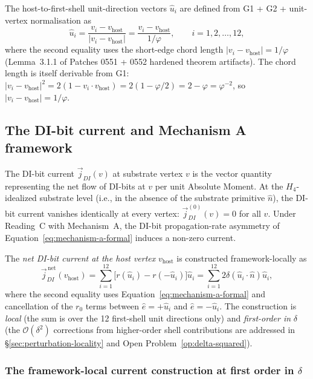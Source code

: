 \documentclass[11pt,letterpaper]{article}
\newcommand{\phig}{\varphi}
\newcommand{\vhost}{v_{\text{host}}}
\newcommand{\jDInet}{\vec{j}_{DI}^{\,\text{net}}}
\newcommand{\bigO}[1]{\mathcal{O}(#1)}
\begin{document}
The host-to-first-shell unit-direction vectors $\hat{u}_i$ are defined from G1 + G2 + unit-vertex normalisation as
\begin{equation}
\hat{u}_i = \frac{v_i - \vhost}{|v_i - \vhost|} = \frac{v_i - \vhost}{1/\phig}, \qquad i = 1, 2, \ldots, 12,
\label{eq:host-to-shell-unit-direction}
\end{equation}
where the second equality uses the short-edge chord length $|v_i - \vhost| = 1/\phig$ (Lemma~3.1.1 of Patches 0551 + 0552 hardened theorem artifacts). The chord length is itself derivable from G1: $|v_i - \vhost|^2 = 2(1 - v_i \cdot \vhost) = 2(1 - \phig/2) = 2 - \phig = \phig^{-2}$, so $|v_i - \vhost| = 1/\phig$.

\subsection{The DI-bit current and Mechanism A framework}
\label{sec:di-bit-current-and-framework}

The DI-bit current $\vec{j}_{DI}(v)$ at substrate vertex $v$ is the vector quantity representing the net flow of DI-bits at $v$ per unit Absolute Moment. At the $H_4$-idealized substrate level (i.e., in the absence of the substrate primitive $\hat{n}$), the DI-bit current vanishes identically at every vertex: $\vec{j}_{DI}^{(0)}(v) = 0$ for all $v$. Under Reading~C with Mechanism~A, the DI-bit propagation-rate asymmetry of Equation~\eqref{eq:mechanism-a-formal} induces a non-zero current.

The \emph{net DI-bit current at the host vertex} $\vhost$ is constructed framework-locally as
\begin{equation}
\jDInet(\vhost) = \sum_{i=1}^{12} \big[ r(\hat{u}_i) - r(-\hat{u}_i) \big] \hat{u}_i = \sum_{i=1}^{12} 2 \delta (\hat{u}_i \cdot \hat{n}) \hat{u}_i,
\label{eq:di-bit-current-construction}
\end{equation}
where the second equality uses Equation~\eqref{eq:mechanism-a-formal} and cancellation of the $r_0$ terms between $\hat{e} = +\hat{u}_i$ and $\hat{e} = -\hat{u}_i$. The construction is \emph{local} (the sum is over the 12 first-shell unit directions only) and \emph{first-order in} $\delta$ (the $\bigO{\delta^2}$ corrections from higher-order shell contributions are addressed in \S\ref{sec:perturbation-locality} and Open Problem~\ref{op:delta-squared}).

\subsubsection*{The framework-local current construction at first order in $\delta$}
\end{document}
